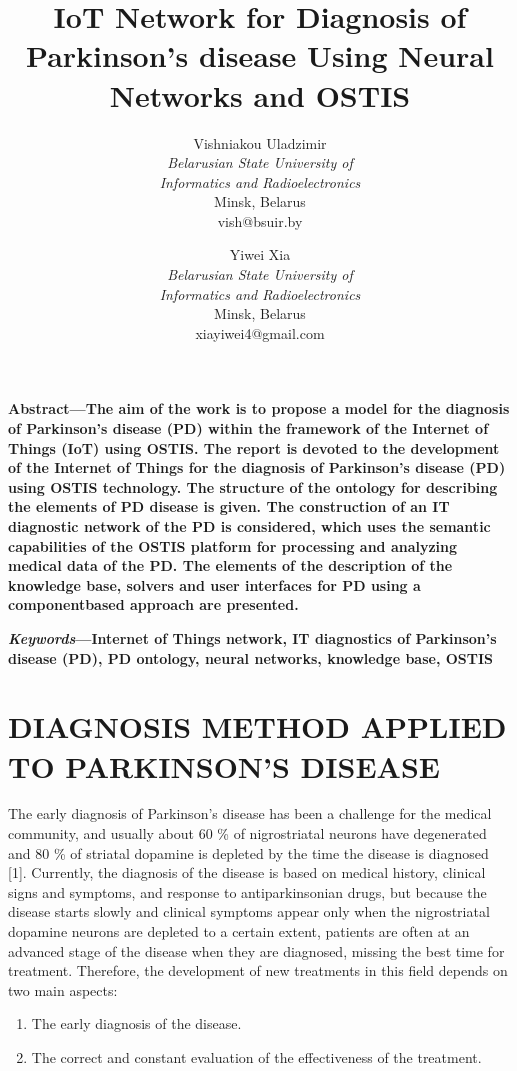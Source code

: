 \documentclass[10pt,two column]{article}
\title{ \huge \textbf{ IoT Network for Diagnosis of Parkinson’s
disease Using Neural Networks and OSTIS } }
\author{
    Vishniakou Uladzimir \\
    \small{ \textit{Belarusian State University of} }\\
    \small{ \textit{Informatics and Radioelectronics} }\\
    \small{ Minsk, Belarus }\\
    \small{ vish@bsuir.by }
    \and
    Yiwei Xia \\
    \small{ \textit{Belarusian State University of} }\\
    \small{ \textit{Informatics and Radioelectronics} }\\
    \small{ Minsk, Belarus } \\
    \small{ xiayiwei4@gmail.com }
}
\date{}
\begin{document}
\maketitle 

\setlength{\parindent}{0.4cm}
\small{
\textbf{Abstract—The aim of the work is to propose a model for the diagnosis of Parkinson’s disease (PD) within the
framework of the Internet of Things (IoT) using OSTIS.
The report is devoted to the development of the Internet
of Things for the diagnosis of Parkinson’s disease (PD)
using OSTIS technology. The structure of the ontology
for describing the elements of PD disease is given. The
construction of an IT diagnostic network of the PD is
considered, which uses the semantic capabilities of the
OSTIS platform for processing and analyzing medical data
of the PD. The elements of the description of the knowledge
base, solvers and user interfaces for PD using a componentbased approach are presented.
}

\textbf{ \textit{Keywords}—Internet of Things network, IT diagnostics
of Parkinson’s disease (PD), PD ontology, neural networks,
knowledge base, OSTIS
}
}
\singlespacing
\section{ \textbf{ DIAGNOSIS METHOD APPLIED TO
PARKINSON’S DISEASE} } 

The early diagnosis of Parkinson’s disease has been a
challenge for the medical community, and usually about
60 \% of nigrostriatal neurons have degenerated and 80 \%
of striatal dopamine is depleted by the time the disease
is diagnosed [1]. Currently, the diagnosis of the disease
is based on medical history, clinical signs and symptoms,
and response to antiparkinsonian drugs, but because the
disease starts slowly and clinical symptoms appear only
when the nigrostriatal dopamine neurons are depleted to
a certain extent, patients are often at an advanced stage
of the disease when they are diagnosed, missing the best
time for treatment. Therefore, the development of new
treatments in this field depends on two main aspects:

\begin{enumerate}[label=\arabic*)]
    \item The early diagnosis of the disease.
    \item The correct and constant evaluation of the effectiveness of the treatment.
\end{enumerate}
\end{document}
